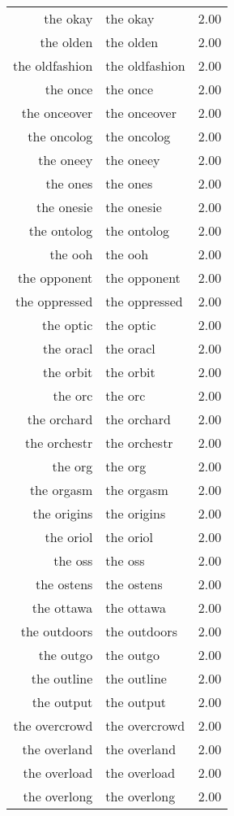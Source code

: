 \begin{table}[ht]
\begin{tabular}{rlr}
  the okay & the okay & 2.00 \\ 
  the olden & the olden & 2.00 \\ 
  the oldfashion & the oldfashion & 2.00 \\ 
  the once & the once & 2.00 \\ 
  the onceover & the onceover & 2.00 \\ 
  the oncolog & the oncolog & 2.00 \\ 
  the oneey & the oneey & 2.00 \\ 
  the ones & the ones & 2.00 \\ 
  the onesie & the onesie & 2.00 \\ 
  the ontolog & the ontolog & 2.00 \\ 
  the ooh & the ooh & 2.00 \\ 
  the opponent & the opponent & 2.00 \\ 
  the oppressed & the oppressed & 2.00 \\ 
  the optic & the optic & 2.00 \\ 
  the oracl & the oracl & 2.00 \\ 
  the orbit & the orbit & 2.00 \\ 
  the orc & the orc & 2.00 \\ 
  the orchard & the orchard & 2.00 \\ 
  the orchestr & the orchestr & 2.00 \\ 
  the org & the org & 2.00 \\ 
  the orgasm & the orgasm & 2.00 \\ 
  the origins & the origins & 2.00 \\ 
  the oriol & the oriol & 2.00 \\ 
  the oss & the oss & 2.00 \\ 
  the ostens & the ostens & 2.00 \\ 
  the ottawa & the ottawa & 2.00 \\ 
  the outdoors & the outdoors & 2.00 \\ 
  the outgo & the outgo & 2.00 \\ 
  the outline & the outline & 2.00 \\ 
  the output & the output & 2.00 \\ 
  the overcrowd & the overcrowd & 2.00 \\ 
  the overland & the overland & 2.00 \\ 
  the overload & the overload & 2.00 \\ 
  the overlong & the overlong & 2.00 \\ 

\end{tabular}
\end{table}
